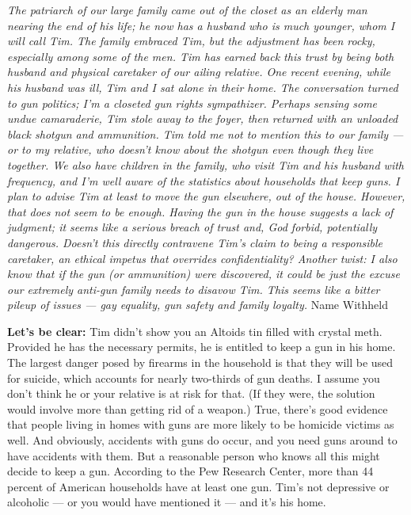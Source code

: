 \emph{The patriarch of our large family came out of the closet as an
elderly man nearing the end of his life; he now has a husband who is
much younger, whom I will call Tim. The family embraced Tim, but the
adjustment has been rocky, especially among some of the men. Tim has
earned back this trust by being both husband and physical caretaker of
our ailing relative. One recent evening, while his husband was ill, Tim
and I sat alone in their home. The conversation turned to gun politics;
I'm a closeted gun rights sympathizer. Perhaps sensing some undue
camaraderie, Tim stole away to the foyer, then returned with an unloaded
black shotgun and ammunition. Tim told me not to mention this to our
family --- or to my relative, who doesn't know about the shotgun even
though they live together. We also have children in the family, who
visit Tim and his husband with frequency, and I'm well aware of the
statistics about households that keep guns. I plan to advise Tim at
least to move the gun elsewhere, out of the house. However, that does
not seem to be enough. Having the gun in the house suggests a lack of
judgment; it seems like a serious breach of trust and, God forbid,
potentially dangerous. Doesn't this directly contravene Tim's claim to
being a responsible caretaker, an ethical impetus that overrides
confidentiality? Another twist: I also know that if the gun (or
ammunition) were discovered, it could be just the excuse our extremely
anti-gun family needs to disavow Tim. This seems like a bitter pileup of
issues --- gay equality, gun safety and family loyalty.} Name Withheld

\textbf{Let's be clear:} Tim didn't show you an Altoids tin filled with
crystal meth. Provided he has the necessary permits, he is entitled to
keep a gun in his home. The largest danger posed by firearms in the
household is that they will be used for suicide, which accounts for
nearly two-thirds of gun deaths. I assume you don't think he or your
relative is at risk for that. (If they were, the solution would involve
more than getting rid of a weapon.) True, there's good evidence that
people living in homes with guns are more likely to be homicide victims
as well. And obviously, accidents with guns do occur, and you need guns
around to have accidents with them. But a reasonable person who knows
all this might decide to keep a gun. According to the Pew Research
Center, more than 44 percent of American households have at least one
gun. Tim's not depressive or alcoholic --- or you would have mentioned
it --- and it's his home.

